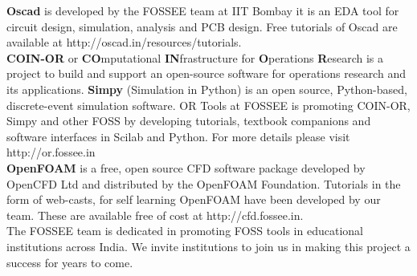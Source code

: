 \documentclass[9pt]{article}
\begin{document}
{\bf{Oscad}} is developed by the FOSSEE team at IIT Bombay it is an
EDA tool for circuit design, simulation, analysis and PCB design. Free
tutorials of Oscad are available at
http://oscad.in/resources/tutorials. \\

{\bf{COIN-OR}} or {\bf{CO}}mputational {\bf{IN}}frastructure for
{\bf{O}}perations {\bf{R}}esearch is a project to build and support an
open-source software for operations research and its
applications. {\bf{Simpy}} (Simulation in Python) is an open source,
Python-based, discrete-event simulation software.  OR Tools at FOSSEE
is promoting COIN-OR, Simpy and other FOSS by developing tutorials,
textbook companions and software interfaces in Scilab and Python. For
more details please visit http://or.fossee.in \\

{\bf{OpenFOAM}} is a free, open source CFD software package developed
by OpenCFD Ltd and distributed by the OpenFOAM Foundation. Tutorials
in the form of web-casts, for self learning OpenFOAM have been
developed by our team. These are available free of cost at
http://cfd.fossee.in. \\

The FOSSEE team is dedicated in promoting FOSS tools in educational
institutions across India. We invite institutions to join us in making
this project a success for years to come.


\end{document}
